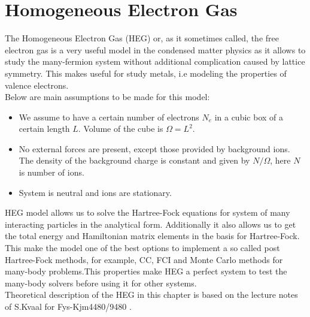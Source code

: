 \chapter{Homogeneous Electron Gas}
The Homogeneous Electron Gas (HEG) or, as it sometimes called, the free electron gas is a very useful model in the condensed matter physics as it allows to study the many-fermion system without additional complication caused by lattice symmetry.  This makes useful for study metals, i.e modeling the properties of valence electrons.\\
Below are main assumptions to be made for this model:
\begin{itemize}
	\item We assume to have a certain number of electrons $N_e$ in a cubic box of a certain length $L$. Volume of the cube is $\Omega= L^2$.
	\item No external forces are present, except those provided by background ions. The density of the background charge is constant and given by $N/\Omega$, here $N$ is number of ions.
	\item System is neutral and ions are stationary.
\end{itemize}

HEG model allows us to solve the Hartree-Fock equations for system of many interacting particles in the analytical form. Additionally it also allows us to get the total energy and Hamiltonian matrix elements in the basis for Hartree-Fock. This make the model one of the best options to implement a so called post Hartree-Fock methods, for example, CC, FCI  and  Monte Carlo methods for many-body problems.This properties make HEG a perfect system to test the many-body solvers before using it for other systems.\\
Theoretical description of the HEG in this chapter is based on the lecture notes of S.Kvaal for Fys-Kjm4480/9480 \cite{s.kvaal.LectureNotesFysKjm44802015}.
